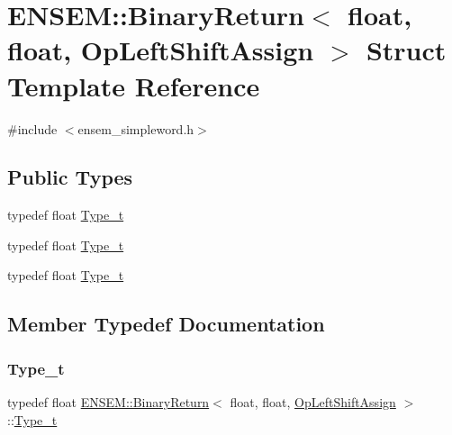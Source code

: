 \hypertarget{structENSEM_1_1BinaryReturn_3_01float_00_01float_00_01OpLeftShiftAssign_01_4}{}\section{E\+N\+S\+EM\+:\+:Binary\+Return$<$ float, float, Op\+Left\+Shift\+Assign $>$ Struct Template Reference}
\label{structENSEM_1_1BinaryReturn_3_01float_00_01float_00_01OpLeftShiftAssign_01_4}


{\ttfamily \#include $<$ensem\+\_\+simpleword.\+h$>$}

\subsection*{Public Types}
\begin{DoxyCompactItemize}
\item 
typedef float \mbox{\hyperlink{structENSEM_1_1BinaryReturn_3_01float_00_01float_00_01OpLeftShiftAssign_01_4_a5a606c4c7a70df274b8a186efebfd11e}{Type\+\_\+t}}
\item 
typedef float \mbox{\hyperlink{structENSEM_1_1BinaryReturn_3_01float_00_01float_00_01OpLeftShiftAssign_01_4_a5a606c4c7a70df274b8a186efebfd11e}{Type\+\_\+t}}
\item 
typedef float \mbox{\hyperlink{structENSEM_1_1BinaryReturn_3_01float_00_01float_00_01OpLeftShiftAssign_01_4_a5a606c4c7a70df274b8a186efebfd11e}{Type\+\_\+t}}
\end{DoxyCompactItemize}


\subsection{Member Typedef Documentation}
\mbox{\label{structENSEM_1_1BinaryReturn_3_01float_00_01float_00_01OpLeftShiftAssign_01_4_a5a606c4c7a70df274b8a186efebfd11e}} 
\subsubsection{\texorpdfstring{Type\_t}{Type\_t}\hspace{0.1cm}{\footnotesize\ttfamily [1/3]}}
{\footnotesize\ttfamily typedef float \mbox{\hyperlink{structENSEM_1_1BinaryReturn}{E\+N\+S\+E\+M\+::\+Binary\+Return}}$<$ float, float, \mbox{\hyperlink{structENSEM_1_1OpLeftShiftAssign}{Op\+Left\+Shift\+Assign}} $>$\+::\mbox{\hyperlink{structENSEM_1_1BinaryReturn_3_01float_00_01float_00_01OpLeftShiftAssign_01_4_a5a606c4c7a70df274b8a186efebfd11e}{Type\+\_\+t}}}

